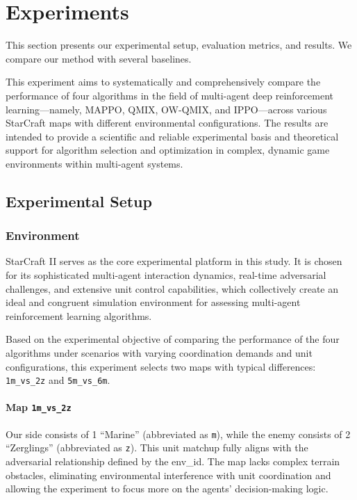 \section{Experiments}\label{sec:experiments}

This section presents our experimental setup, evaluation metrics, and results. We compare our method with several baselines.

This experiment aims to systematically and comprehensively compare the performance of four algorithms in the field of multi-agent deep reinforcement learning—namely, MAPPO, QMIX, OW-QMIX, and IPPO—across various StarCraft maps with different environmental configurations. The results are intended to provide a scientific and reliable experimental basis and theoretical support for algorithm selection and optimization in complex, dynamic game environments within multi-agent systems.

\subsection{Experimental Setup}
\subsubsection{Environment}

StarCraft II serves as the core experimental platform in this study. It is chosen for its sophisticated multi-agent interaction dynamics, real-time adversarial challenges, and extensive unit control capabilities, which collectively create an ideal and congruent simulation environment for assessing multi-agent reinforcement learning algorithms.

Based on the experimental objective of comparing the performance of the four algorithms under scenarios with varying coordination demands and unit configurations, this experiment selects two maps with typical differences: \texttt{1m\_vs\_2z} and \texttt{5m\_vs\_6m}. 

\paragraph{Map \texttt{1m\_vs\_2z}} 
Our side consists of 1 ``Marine'' (abbreviated as \texttt{m}), while the enemy consists of 2 ``Zerglings'' (abbreviated as \texttt{z}). This unit matchup fully aligns with the adversarial relationship defined by the env\_id. The map lacks complex terrain obstacles, eliminating environmental interference with unit coordination and allowing the experiment to focus more on the agents' decision-making logic.

